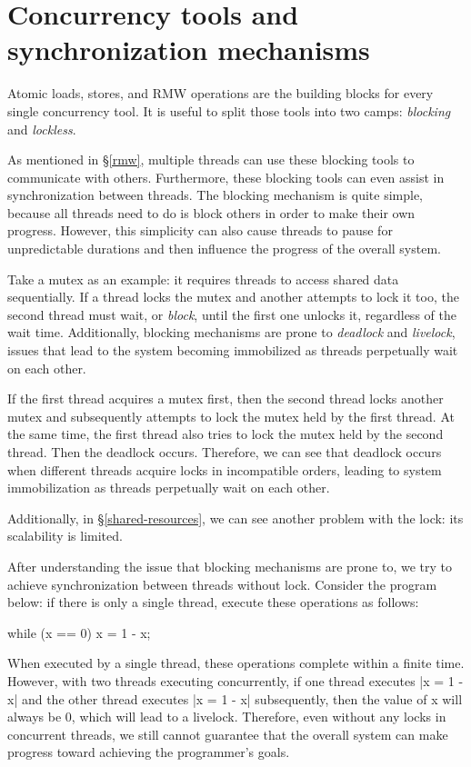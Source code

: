 \documentclass[fontsize=10pt, oneside]{scrartcl}
\newcommand{\introduce}[1]{\textit{#1}}
\newcommand{\secref}[1]{\hyperref[#1]{\textsc{\S}\ref*{#1}}}
\begin{document}
\section{Concurrency tools and synchronization mechanisms}
\label{concurrency-tool}
Atomic loads, stores, and \textsc{RMW} operations are the building blocks for every single concurrency tool.
It is useful to split those tools into two camps:
\introduce{blocking} and \introduce{lockless}.

As mentioned in \secref{rmw}, multiple threads can use these blocking tools to communicate with others. 
Furthermore, these blocking tools can even assist in synchronization between threads. 
The blocking mechanism is quite simple, 
because all threads need to do is block others in order to make their own progress. 
However, this simplicity can also cause threads to pause for unpredictable durations and then influence the progress of the overall system.

Take a mutex as an example:
it requires threads to access shared data sequentially.
If a thread locks the mutex and another attempts to lock it too,
the second thread must wait, or \introduce{block},
until the first one unlocks it, regardless of the wait time.
Additionally, blocking mechanisms are prone to \introduce{deadlock} and \introduce{livelock},
issues that lead to the system becoming immobilized as threads perpetually wait on each other.

If the first thread acquires a mutex first, 
then the second thread locks another mutex and subsequently attempts to lock the mutex held by the first thread. 
At the same time, the first thread also tries to lock the mutex held by the second thread.
Then the deadlock occurs.
Therefore, we can see that deadlock occurs when different threads acquire locks in incompatible orders, 
leading to system immobilization as threads perpetually wait on each other. 

Additionally, in \secref{shared-resources}, 
we can see another problem with the lock: its scalability is limited.

After understanding the issue that blocking mechanisms are prone to, 
we try to achieve synchronization between threads without lock. 
Consider the program below: if there is only a single thread, execute these operations as follows:

\begin{cppcode}
while (x == 0)
    x = 1 - x;
\end{cppcode}

When executed by a single thread, these operations complete within a finite time. 
However, with two threads executing concurrently, 
if one thread executes \cpp|x = 1 - x| and the other thread executes \cpp|x = 1 - x| subsequently, 
then the value of x will always be 0, which will lead to a livelock. 
Therefore, even without any locks in concurrent threads, 
we still cannot guarantee that the overall system can make progress toward achieving the programmer's goals.
\end{document}

